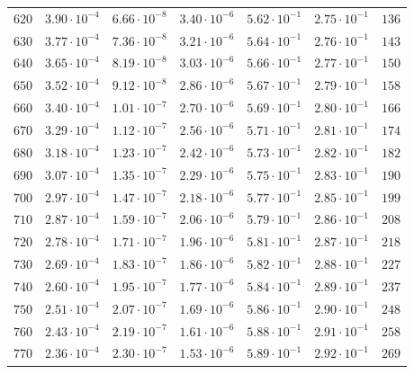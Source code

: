 \begin{table}
\begin{tabular}{ccccccc}
$620 $&$ 3.90\cdot 10^{-4}  $&$ 6.66\cdot 10^{-8}  $&$ 3.40\cdot 10^{-6}  $&$ 5.62\cdot 10^{-1}  $&$ 2.75\cdot 10^{-1}  $&$ 136 $\\
$630 $&$ 3.77\cdot 10^{-4}  $&$ 7.36\cdot 10^{-8}  $&$ 3.21\cdot 10^{-6}  $&$ 5.64\cdot 10^{-1}  $&$ 2.76\cdot 10^{-1}  $&$ 143 $\\
$640 $&$ 3.65\cdot 10^{-4}  $&$ 8.19\cdot 10^{-8}  $&$ 3.03\cdot 10^{-6}  $&$ 5.66\cdot 10^{-1}  $&$ 2.77\cdot 10^{-1}  $&$ 150 $\\
$650 $&$ 3.52\cdot 10^{-4}  $&$ 9.12\cdot 10^{-8}  $&$ 2.86\cdot 10^{-6}  $&$ 5.67\cdot 10^{-1}  $&$ 2.79\cdot 10^{-1}  $&$ 158 $\\
$660 $&$ 3.40\cdot 10^{-4}  $&$ 1.01\cdot 10^{-7}  $&$ 2.70\cdot 10^{-6}  $&$ 5.69\cdot 10^{-1}  $&$ 2.80\cdot 10^{-1}  $&$ 166 $\\
$670 $&$ 3.29\cdot 10^{-4}  $&$ 1.12\cdot 10^{-7}  $&$ 2.56\cdot 10^{-6}  $&$ 5.71\cdot 10^{-1}  $&$ 2.81\cdot 10^{-1}  $&$ 174 $\\
$680 $&$ 3.18\cdot 10^{-4}  $&$ 1.23\cdot 10^{-7}  $&$ 2.42\cdot 10^{-6}  $&$ 5.73\cdot 10^{-1}  $&$ 2.82\cdot 10^{-1}  $&$ 182 $\\
$690 $&$ 3.07\cdot 10^{-4}  $&$ 1.35\cdot 10^{-7}  $&$ 2.29\cdot 10^{-6}  $&$ 5.75\cdot 10^{-1}  $&$ 2.83\cdot 10^{-1}  $&$ 190 $\\
$700 $&$ 2.97\cdot 10^{-4}  $&$ 1.47\cdot 10^{-7}  $&$ 2.18\cdot 10^{-6}  $&$ 5.77\cdot 10^{-1}  $&$ 2.85\cdot 10^{-1}  $&$ 199 $\\
$710 $&$ 2.87\cdot 10^{-4}  $&$ 1.59\cdot 10^{-7}  $&$ 2.06\cdot 10^{-6}  $&$ 5.79\cdot 10^{-1}  $&$ 2.86\cdot 10^{-1}  $&$ 208 $\\
$720 $&$ 2.78\cdot 10^{-4}  $&$ 1.71\cdot 10^{-7}  $&$ 1.96\cdot 10^{-6}  $&$ 5.81\cdot 10^{-1}  $&$ 2.87\cdot 10^{-1}  $&$ 218 $\\
$730 $&$ 2.69\cdot 10^{-4}  $&$ 1.83\cdot 10^{-7}  $&$ 1.86\cdot 10^{-6}  $&$ 5.82\cdot 10^{-1}  $&$ 2.88\cdot 10^{-1}  $&$ 227 $\\
$740 $&$ 2.60\cdot 10^{-4}  $&$ 1.95\cdot 10^{-7}  $&$ 1.77\cdot 10^{-6}  $&$ 5.84\cdot 10^{-1}  $&$ 2.89\cdot 10^{-1}  $&$ 237 $\\
$750 $&$ 2.51\cdot 10^{-4}  $&$ 2.07\cdot 10^{-7}  $&$ 1.69\cdot 10^{-6}  $&$ 5.86\cdot 10^{-1}  $&$ 2.90\cdot 10^{-1}  $&$ 248 $\\
$760 $&$ 2.43\cdot 10^{-4}  $&$ 2.19\cdot 10^{-7}  $&$ 1.61\cdot 10^{-6}  $&$ 5.88\cdot 10^{-1}  $&$ 2.91\cdot 10^{-1}  $&$ 258 $\\
$770 $&$ 2.36\cdot 10^{-4}  $&$ 2.30\cdot 10^{-7}  $&$ 1.53\cdot 10^{-6}  $&$ 5.89\cdot 10^{-1}  $&$ 2.92\cdot 10^{-1}  $&$ 269 $\\

\end{tabular}
\end{table}
